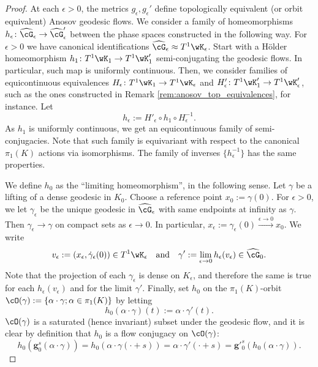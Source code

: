 \documentclass[reqno,11pt]{amsart}
\begin{document}
\begin{proof}
\par At each \(\epsilon>0\), the metrics \(g_\epsilon, g_\epsilon'\) define topologically  equivalent (or orbit equivalent) Anosov geodesic flows.
We consider a family of homeomorphisms \(h_\epsilon\colon \widehat{\cG}_\epsilon \to \widehat{\cG}_\epsilon'\) between the phase spaces constructed in the following way. 
For \(\epsilon > 0\) we have canonical identifications \(\widehat{\cG}_\epsilon \approx T^1\wK_\epsilon\). 
Start with a Hölder homeomorphism \(h_1\colon T^1\wK_1 \to T^1\wK'_1\) semi-conjugating the geodesic flows.
In particular, such map is uniformly continuous.
Then, we consider families of equicontinuous equivalences \(H_\epsilon\colon T^1\wK_1 \to T^1\wK_\epsilon \) and \(H'_\epsilon\colon T^1\wK'_1 \to T^1\wK'_\epsilon \), such as the ones constructed in Remark \ref{rem:anosov_top_equivalences}, for instance.
Let
\[
    h_\epsilon := H'_\epsilon \circ h_1 \circ H^{-1}_\epsilon.
\]
As \(h_1\) is uniformly continuous, we get an equicontinuous family of semi-conjugacies.
Note that such family is equivariant with respect to the canonical \(\pi_1(K)\) actions via isomorphisms.
The family of inverses \(\{h_\epsilon^{-1}\}\) has the same properties.
\par We define \(h_0\) as the ``limiting homeomorphism'', in the following sense.
Let \(\gamma\) be a lifting of a dense geodesic in \(K_0\). 
Choose a reference point \(x_0 := \gamma(0)\).
For \(\epsilon > 0\), we let \(\gamma_\epsilon\) be the unique geodesic in \(\widehat{\cG}_\epsilon\) with same endpoints at infinity as \(\gamma\).
Then \(\gamma_\epsilon \to \gamma\) on compact sets as \(\epsilon \to 0\).
In particular, \(x_\epsilon := \gamma_\epsilon(0) \xrightarrow{\epsilon \to 0} x_0\).
We write 
\[
    v_\epsilon := (x_\epsilon, \dot\gamma_\epsilon(0)) \in T^1\wK_\epsilon \quad \text{and} \quad \gamma' := \lim_{\epsilon \to 0}h_\epsilon(v_\epsilon) \in \widehat{\cG}_0.
\]
Note that the projection of each \(\gamma_\epsilon\) is dense on \(K_\epsilon\), and therefore the same is true for each \(h_\epsilon(v_\epsilon)\) and for the limit \(\gamma'\).
Finally, set \(h_0\) on the \(\pi_1(K)\)-orbit \(\cO(\gamma) := \{\alpha\cdot \gamma; \alpha \in \pi_1(K)\}\) by letting
\[
    h_0(\alpha\cdot\gamma)(t) := \alpha\cdot\gamma' (t). 
\]
\(\cO(\gamma)\) is a saturated (hence invariant) subset under the geodesic flow, and it is clear by definition that \(h_0\) is a flow conjugacy on \(\cO(\gamma)\):
\[
    h_0(\mathbf{g}_0^s(\alpha\cdot\gamma)) = h_0(\alpha\cdot\gamma(\cdot + s)) = \alpha\cdot\gamma'(\cdot+ s) = \mathbf{g}'^s_0(h_0(\alpha\cdot\gamma)).
\]
\end{proof}
\end{document}
